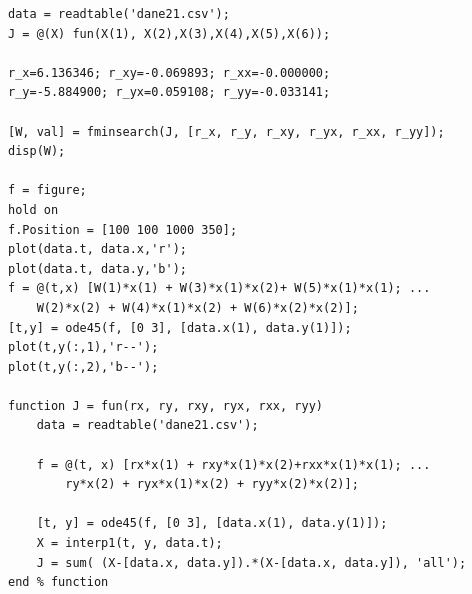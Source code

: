 \documentclass[12pt]{article}
\begin{document}
\break

\begin{lstlisting}[caption=Zadanie 2]
data = readtable('dane21.csv');
J = @(X) fun(X(1), X(2),X(3),X(4),X(5),X(6));

r_x=6.136346; r_xy=-0.069893; r_xx=-0.000000;
r_y=-5.884900; r_yx=0.059108; r_yy=-0.033141;

[W, val] = fminsearch(J, [r_x, r_y, r_xy, r_yx, r_xx, r_yy]);
disp(W);

f = figure;
hold on 
f.Position = [100 100 1000 350];
plot(data.t, data.x,'r');
plot(data.t, data.y,'b');
f = @(t,x) [W(1)*x(1) + W(3)*x(1)*x(2)+ W(5)*x(1)*x(1); ...
    W(2)*x(2) + W(4)*x(1)*x(2) + W(6)*x(2)*x(2)];
[t,y] = ode45(f, [0 3], [data.x(1), data.y(1)]);
plot(t,y(:,1),'r--');
plot(t,y(:,2),'b--');

function J = fun(rx, ry, rxy, ryx, rxx, ryy)
    data = readtable('dane21.csv');
    
    f = @(t, x) [rx*x(1) + rxy*x(1)*x(2)+rxx*x(1)*x(1); ...
        ry*x(2) + ryx*x(1)*x(2) + ryy*x(2)*x(2)];

    [t, y] = ode45(f, [0 3], [data.x(1), data.y(1)]);
    X = interp1(t, y, data.t);
    J = sum( (X-[data.x, data.y]).*(X-[data.x, data.y]), 'all'); 
end % function
\end{lstlisting}
\end{document}
